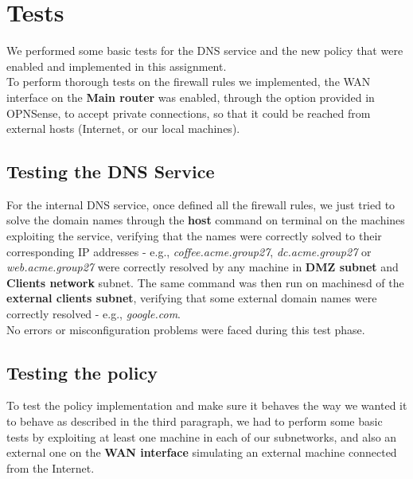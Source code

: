 \section{Tests}
We performed some basic tests for the DNS service and the new policy that were enabled and implemented in this assignment.\\
To perform thorough tests on the firewall rules we implemented, the WAN interface on the \textbf{Main router} was enabled, through the option provided in OPNSense, to accept private connections, so that it could be reached from external hosts (Internet, or our local machines).\\

\subsection{Testing the DNS Service}
For the internal DNS service, once defined all the firewall rules, we just tried to solve the domain names through the \textbf{host} command on terminal on the machines exploiting the service, verifying that the names were correctly solved to their corresponding IP addresses - e.g., \textit{coffee.acme.group27}, \textit{dc.acme.group27} or \textit{web.acme.group27} were correctly resolved by any machine in \textbf{DMZ subnet} and \textbf{Clients network} subnet. The same command was then run on machinesd of the \textbf{external clients subnet}, verifying that some external domain names were correctly resolved - e.g., \textit{google.com}.\\
No errors or misconfiguration problems were faced during this test phase.

\subsection{Testing the policy}
To test the policy implementation and make sure it behaves the way we wanted it to behave as described in the third paragraph, we had to perform some basic tests by exploiting at least one machine in each of our subnetworks, and also an external one on the \textbf{WAN interface} simulating an external machine connected from the Internet.
